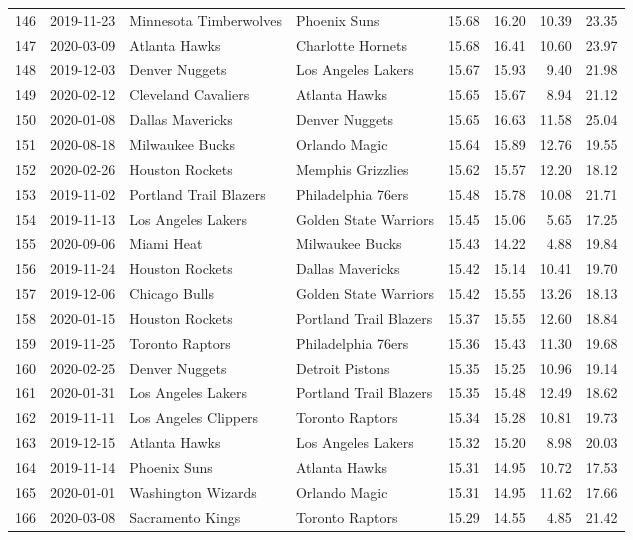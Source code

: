 \documentclass[
  11pt,
]{article}
\theoremstyle{nonumberplain}
\begin{document}
\begin{longtable}{rl|llr|rrr}
146 & 2019-11-23 & Minnesota Timberwolves & Phoenix Suns & 15.68 & 16.20 & 10.39 & 23.35\\
147 & 2020-03-09 & Atlanta Hawks & Charlotte Hornets & 15.68 & 16.41 & 10.60 & 23.97\\
148 & 2019-12-03 & Denver Nuggets & Los Angeles Lakers & 15.67 & 15.93 & 9.40 & 21.98\\
149 & 2020-02-12 & Cleveland Cavaliers & Atlanta Hawks & 15.65 & 15.67 & 8.94 & 21.12\\
150 & 2020-01-08 & Dallas Mavericks & Denver Nuggets & 15.65 & 16.63 & 11.58 & 25.04\\
151 & 2020-08-18 & Milwaukee Bucks & Orlando Magic & 15.64 & 15.89 & 12.76 & 19.55\\
152 & 2020-02-26 & Houston Rockets & Memphis Grizzlies & 15.62 & 15.57 & 12.20 & 18.12\\
153 & 2019-11-02 & Portland Trail Blazers & Philadelphia 76ers & 15.48 & 15.78 & 10.08 & 21.71\\
154 & 2019-11-13 & Los Angeles Lakers & Golden State Warriors & 15.45 & 15.06 & 5.65 & 17.25\\
155 & 2020-09-06 & Miami Heat & Milwaukee Bucks & 15.43 & 14.22 & 4.88 & 19.84\\
156 & 2019-11-24 & Houston Rockets & Dallas Mavericks & 15.42 & 15.14 & 10.41 & 19.70\\
157 & 2019-12-06 & Chicago Bulls & Golden State Warriors & 15.42 & 15.55 & 13.26 & 18.13\\
158 & 2020-01-15 & Houston Rockets & Portland Trail Blazers & 15.37 & 15.55 & 12.60 & 18.84\\
159 & 2019-11-25 & Toronto Raptors & Philadelphia 76ers & 15.36 & 15.43 & 11.30 & 19.68\\
160 & 2020-02-25 & Denver Nuggets & Detroit Pistons & 15.35 & 15.25 & 10.96 & 19.14\\
161 & 2020-01-31 & Los Angeles Lakers & Portland Trail Blazers & 15.35 & 15.48 & 12.49 & 18.62\\
162 & 2019-11-11 & Los Angeles Clippers & Toronto Raptors & 15.34 & 15.28 & 10.81 & 19.73\\
163 & 2019-12-15 & Atlanta Hawks & Los Angeles Lakers & 15.32 & 15.20 & 8.98 & 20.03\\
164 & 2019-11-14 & Phoenix Suns & Atlanta Hawks & 15.31 & 14.95 & 10.72 & 17.53\\
165 & 2020-01-01 & Washington Wizards & Orlando Magic & 15.31 & 14.95 & 11.62 & 17.66\\
166 & 2020-03-08 & Sacramento Kings & Toronto Raptors & 15.29 & 14.55 & 4.85 & 21.42\\

\end{longtable}
\end{document}
